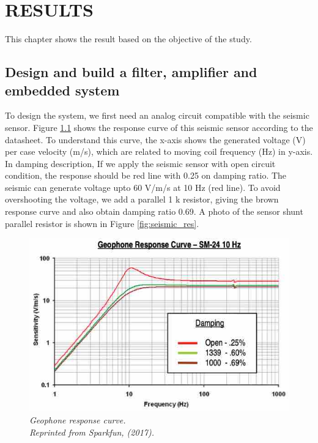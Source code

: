 \setlength{\parindent}{0in}
\setlength{\parskip}{1em}
\setlength{\baselineskip}{1.6em}

\chapter{RESULTS}
\label{ch:results}
This chapter shows the result based on the objective of the study. 
\section{Design and build a filter, amplifier and embedded system}

To design the system, we first need an analog circuit compatible with the seismic sensor. Figure \ref{fig:seismic_curve} shows the response curve of this seismic sensor according to the datasheet. To understand this curve, the x-axis shows the generated voltage (V) per case velocity (m/s), which are related to moving coil frequency (Hz) in y-axis. In damping description, If we apply the seismic sensor with open circuit condition, the response should be red line with 0.25 on damping ratio. The seismic can generate voltage upto 60 V/m/s at 10 Hz (red line). To avoid overshooting the voltage, we add a parallel 1 k resistor, giving the brown response curve and also obtain damping ratio 0.69. A photo of the sensor shunt parallel resistor is shown in Figure \ref{fig:seismic_res}.

\begin{figure}[H]
  \centering
  \caption[Geophone response curve.]{\emph{Geophone response curve. \\Reprinted from Sparkfun, (2017). }}\label{fig:seismic_curve}
  \includegraphics[scale = 0.7]{figures/seismic_graph.jpg}
\end{figure}

